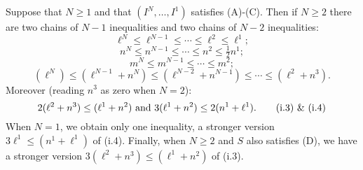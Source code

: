 \documentclass[10pt]{article}
\newcommand{\minDim}{m}
\begin{document}
\begin{KoszulSequenceCombinatorics}


\begin{cor}Suppose that $N\geq1$ and that $(I^N,\ldots,I^1)$ satisfies \textup{(A)}-\textup{(C)}. %
Then if $N\geq2$ there are two chains of $N-1$ inequalities and two chains of $N-2$ inequalities:
\begin{equation}
\ell^N\leq \ell^{N-1}\leq\cdots \leq \ell^2\leq \ell^1;\tag{c.0}
\end{equation}
\begin{equation}
n^N\leq n^{N-1}\leq\cdots \leq n^2\leq \tfrac{1}{2}n^1;\tag{c.1}
\end{equation}
\begin{equation}
\minDim^N\leq \minDim^{N-1}\leq\cdots \leq \minDim^2;\tag{c.2}
\end{equation}
\begin{equation}
(\ell^N)\leq(\ell^{N-1}+n^N)\leq(\ell^{N-2}+n^{N-1})\leq\cdots \leq (\ell^2+n^3).\tag{c.3}
\end{equation}
Moreover (reading $n^3$ as zero when $N=2$):
\begin{equation}
2(\ell^2+n^3)\leq(\ell^1+n^2)\textup{\ and\ }3(\ell^1+n^2)\leq 2(n^1+\ell^1).\tag{i.3) \& (i.4}
\end{equation}
When $N=1$, we obtain only one inequality, a stronger version $3\ell^1\leq(n^1+\ell^1)$ of \textup{(i.4)}.
Finally, when $N\geq2$ and $S$ also satisfies \textup{(D)}, we have a stronger version $3(\ell^2+n^3)\leq(\ell^1+n^2)$ of \textup{(i.3)}.
\end{cor}


\end{KoszulSequenceCombinatorics}
\end{document}
